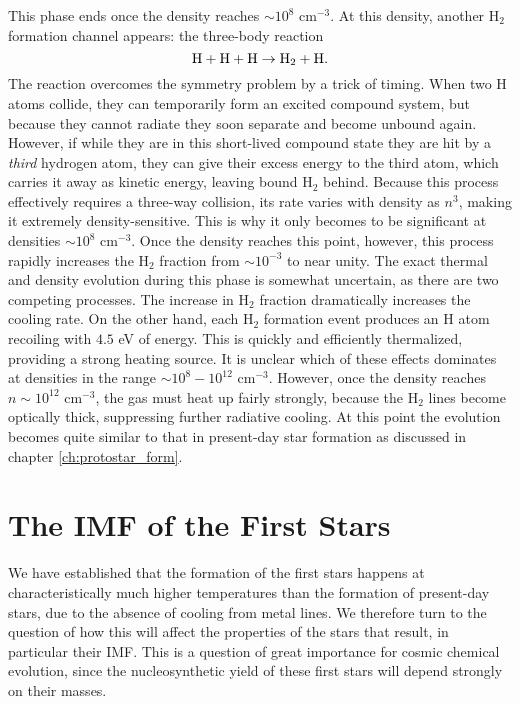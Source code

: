 This phase ends once the density reaches $\sim 10^8$ cm$^{-3}$. At this density, another H$_2$ formation channel appears: the three-body reaction
\begin{equation}
{\rm H} + {\rm H} + {\rm H} \rightarrow {\rm H}_2 + {\rm H}.
\end{equation}
The reaction overcomes the symmetry problem by a trick of timing. When two H atoms collide, they can temporarily form an excited compound system, but because they cannot radiate they soon separate and become unbound again. However, if while they are in this short-lived compound state they are hit by a \textit{third} hydrogen atom, they can give their excess energy to the third atom, which carries it away as kinetic energy, leaving bound H$_2$ behind. Because this process effectively requires a three-way collision, its rate varies with density as $n^3$, making it extremely density-sensitive. This is why it only becomes to be significant at densities $\sim 10^8$ cm$^{-3}$. Once the density reaches this point, however, this process rapidly increases the H$_2$ fraction from $\sim 10^{-3}$ to near unity. The exact thermal and density evolution during this phase is somewhat uncertain, as there are two competing processes. The increase in H$_2$ fraction dramatically increases the cooling rate. On the other hand, each H$_2$ formation event produces an H atom recoiling with $4.5$ eV of energy. This is quickly and efficiently thermalized, providing a strong heating source. It is unclear which of these effects dominates at densities in the range $\sim 10^8-10^{12}$ cm$^{-3}$. However, once the density reaches $n\sim 10^{12}$ cm$^{-3}$, the gas must heat up fairly strongly, because the H$_2$ lines become optically thick, suppressing further radiative cooling. At this point the evolution becomes quite similar to that in present-day star formation as discussed in chapter \ref{ch:protostar_form}.


\section{The IMF of the First Stars}

We have established that the formation of the first stars happens at characteristically much higher temperatures than the formation of present-day stars, due to the absence of cooling from metal lines. We therefore turn to the question of how this will affect the properties of the stars that result, in particular their IMF. This is a question of great importance for cosmic chemical evolution, since the nucleosynthetic yield of these first stars will depend strongly on their masses.


